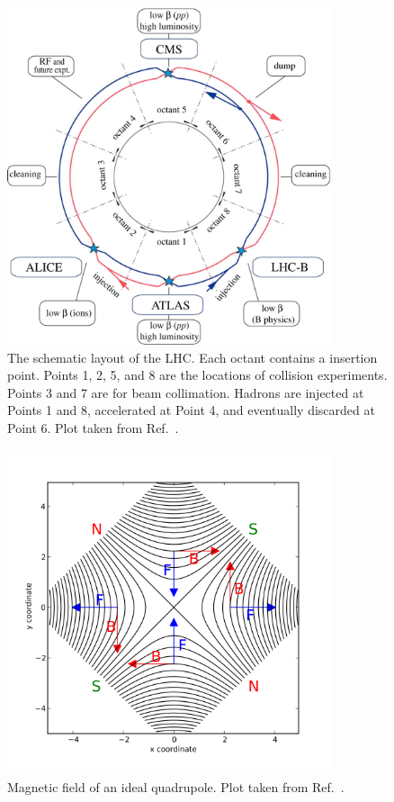 \begin{figure}[!htb]
    \centering
    \captionsetup{justification=justified}
    \includegraphics[width=0.85\textwidth]{pics/LHC_CMS/LHC_scheme.jpg}
    \caption{The schematic layout of the LHC. Each octant contains a insertion point.
             Points 1, 2, 5, and 8 are the locations of collision experiments. Points 3 and 7 are for beam collimation. 
             Hadrons are injected at Points 1 and 8, accelerated at Point 4, and eventually discarded at Point 6.
             Plot taken from Ref.~\cite{Evans_2008}. }
    \label{fig:lhc_scheme}
\end{figure}

\begin{figure}[!htb]
    \centering
    \captionsetup{justification=centering}
    \includegraphics[width=0.85\textwidth]{pics/LHC_CMS/quadrupole_field.png}
    \caption{Magnetic field of an ideal quadrupole.
             Plot taken from Ref.~\cite{quadrupole_wiki}.}
    \label{fig:quad_field}
\end{figure}

